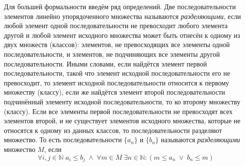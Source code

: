 \documentclass[12pt]{article}
\begin{document}
Для большей формальности введём ряд определений. Две последовательности элементов линейно упорядоченного множества называются {\it разделяющими}, если любой элемент одной последовательности не превосходит любого элемента другой и любой элемент исходного множества может быть отнесён к одному из двух множеств (классов): элементов, не превосходящих все элементы одной последовательности, и элементов, не подчиняющих все элементы другой последовательности. Иными словами, если найдётся элемент первой последовательности, такой что элемент исходной последовательности его не превосходит, то элемент исходной последовательности относится к первому множеству (классу), если же найдётся элемент второй последовательности подчинённый элементу исходной последовательности, то ко второму множеству (классу). Если все элементы первой последовательности не превосходят всех элементов второй, и не существует элементов исходного множества, которые не относятся к одному из данных классов, то последовательности разделяют множество. То есть последовательности $\{a_n\}$ и $\{b_n\}$ называются {\it разделяющими} множество $M$, если
\begin{equation}
\forall i, j \in \mathbb{N} \; a_i \leq b_j \; \wedge \; \forall m \in M \; \exists n \in \mathbb{N}: (m \leq a_n \; \vee \; b_n \leq m)
\end{equation}
\end{document}
